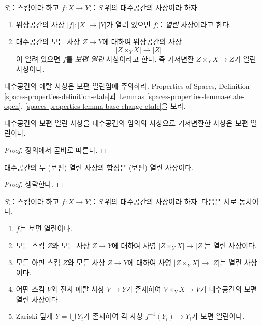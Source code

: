 \begin{definition}
\label{definition-open}
$S$를 스킴이라 하고 $f : X \to Y$를 $S$ 위의 대수공간의 사상이라 하자.
\begin{enumerate}
\item 위상공간의 사상 $|f| : |X| \to |Y|$가 열려 있으면
$f$를 {\it 열린} 사상이라고 한다.
\item 대수공간의 모든 사상 $Z \to Y$에 대하여 위상공간의 사상
$$
|Z \times_Y X| \to |Z|
$$
이 열려 있으면 $f$를 {\it 보편 열린} 사상이라고 한다.
즉 기저변환 $Z \times_Y X \to Z$가 열린 사상이다.
\end{enumerate}
\end{definition}

\noindent
대수공간의 에탈 사상은 보편 열린임에 주의하라.
Properties of Spaces, Definition
\ref{spaces-properties-definition-etale}과 Lemmas
\ref{spaces-properties-lemma-etale-open},
\ref{spaces-properties-lemma-base-change-etale}을 보라.

\begin{lemma}
\label{lemma-base-change-universally-open}
대수공간의 보편 열린 사상을 대수공간의 임의의 사상으로 기저변환한
사상은 보편 열린이다.
\end{lemma}

\begin{proof}
정의에서 곧바로 따른다.
\end{proof}

\begin{lemma}
\label{lemma-composition-open}
대수공간의 두 (보편) 열린 사상의 합성은 (보편) 열린 사상이다.
\end{lemma}

\begin{proof}
생략한다.
\end{proof}

\begin{lemma}
\label{lemma-universally-open-local}
$S$를 스킴이라 하고 $f : X \to Y$를 $S$ 위의 대수공간의 사상이라 하자.
다음은 서로 동치이다.
\begin{enumerate}
\item $f$는 보편 열린이다.
\item 모든 스킴 $Z$와 모든 사상 $Z \to Y$에 대하여 사영
$|Z \times_Y X| \to |Z|$는 열린 사상이다.
\item 모든 아핀 스킴 $Z$와 모든 사상 $Z \to Y$에 대하여 사영
$|Z \times_Y X| \to |Z|$는 열린 사상이다.
\item 어떤 스킴 $V$와 전사 에탈 사상 $V \to Y$가 존재하여
$V \times_Y X \to V$가 대수공간의 보편 열린 사상이다.
\item Zariski 덮개 $Y = \bigcup Y_i$가 존재하여 각 사상
$f^{-1}(Y_i) \to Y_i$가 보편 열린이다.
\end{enumerate}
\end{lemma}

